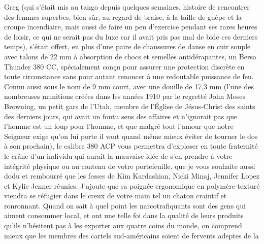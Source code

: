 \illusloflabel{}%
Greg (qui s’était mis au tango depuis quelques semaines, histoire de rencontrer des femmes superbes, bien sûr, au regard de braise, à la taille de guêpe et la croupe incendiaire, mais aussi de faire un peu d’exercice pendant ses rares heures de loisir, ce qui ne serait pas du luxe car il avait pris pas mal de bide ces derniers temps), s’était offert, en plus d’une paire de chaussures de danse en cuir souple avec talons de 22 mm à absorption de chocs et semelles antidérapantes, un Bersa Thunder 380 CC, spécialement conçu pour assurer une protection discrète en toute circonstance sans pour autant renoncer à une redoutable puissance de feu. Connu aussi sous le nom de 9 mm court, avec une douille de 17,3 mm (l’une des nombreuses munitions créées dans les années 1910 par le regretté John Moses Browning, un petit gars de l’Utah, membre de l’Église de Jésus-Christ des saints des derniers jours, qui avait un foutu sens des affaires et n’ignorait pas que l’homme est un loup pour l’homme, et que malgré tout l’amour que notre Seigneur exige qu’on lui porte il vaut quand même mieux éviter de tourner le dos à son prochain), le calibre 380 ACP vous permettra d’exploser en toute fraternité le crâne d’un individu qui aurait la mauvaise idée de s’en prendre à votre intégrité physique ou au contenu de votre portefeuille, que je vous souhaite aussi dodu et rembourré que les fesses de Kim Kardashian, Nicki Minaj, Jennifer Lopez et Kylie Jenner réunies. J’ajoute que sa poignée ergonomique en polymère texturé viendra se réfugier dans le creux de votre main tel un chaton craintif et ronronnant. Quand on sait à quel point les narcotrafiquants sont des gens qui aiment consommer local, et ont une telle foi dans la qualité de leurs produits qu’ils n’hésitent pas à les exporter aux quatre coins du monde, on comprend mieux que les membres des cartels sud-américains soient de fervents adeptes de la 